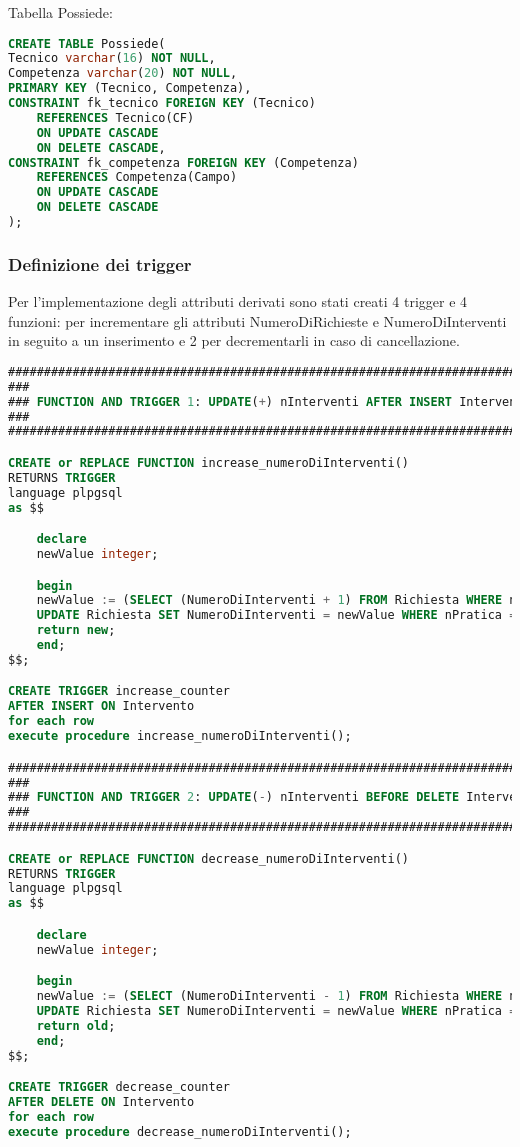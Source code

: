 \documentclass{article}
\begin{document}
\newpage
Tabella Possiede:
\begin{lstlisting}[language=SQL]
CREATE TABLE Possiede(
Tecnico varchar(16) NOT NULL,
Competenza varchar(20) NOT NULL,
PRIMARY KEY (Tecnico, Competenza),
CONSTRAINT fk_tecnico FOREIGN KEY (Tecnico)
	REFERENCES Tecnico(CF)
	ON UPDATE CASCADE
	ON DELETE CASCADE,
CONSTRAINT fk_competenza FOREIGN KEY (Competenza)
	REFERENCES Competenza(Campo)
	ON UPDATE CASCADE
	ON DELETE CASCADE
);
\end{lstlisting}

\subsubsection{Definizione dei trigger}

Per l'implementazione degli attributi derivati sono stati creati 4 trigger e 4 funzioni:  per incrementare gli attributi NumeroDiRichieste e NumeroDiInterventi in seguito a un inserimento e 
2 per decrementarli in caso di cancellazione.



\begin{lstlisting}[language=SQL]
##############################################################################
###                                                                        ###
### FUNCTION AND TRIGGER 1: UPDATE(+) nInterventi AFTER INSERT Intervento  ###
###                                                                        ###
##############################################################################

CREATE or REPLACE FUNCTION increase_numeroDiInterventi()
RETURNS TRIGGER
language plpgsql
as $$

	declare
	newValue integer;

	begin
	newValue := (SELECT (NumeroDiInterventi + 1) FROM Richiesta WHERE nPratica = new.Richiesta);
	UPDATE Richiesta SET NumeroDiInterventi = newValue WHERE nPratica = new.Richiesta;
	return new;
	end;
$$;

CREATE TRIGGER increase_counter
AFTER INSERT ON Intervento
for each row
execute procedure increase_numeroDiInterventi();

##############################################################################
###                                                                        ###
### FUNCTION AND TRIGGER 2: UPDATE(-) nInterventi BEFORE DELETE Intervento ###
###                                                                        ###
##############################################################################

CREATE or REPLACE FUNCTION decrease_numeroDiInterventi()
RETURNS TRIGGER
language plpgsql
as $$

	declare
	newValue integer;

	begin
	newValue := (SELECT (NumeroDiInterventi - 1) FROM Richiesta WHERE nPratica = old.Richiesta);
	UPDATE Richiesta SET NumeroDiInterventi = newValue WHERE nPratica = old.Richiesta;
	return old;
	end;
$$;

CREATE TRIGGER decrease_counter
AFTER DELETE ON Intervento
for each row
execute procedure decrease_numeroDiInterventi();
\end{lstlisting}
\end{document}
